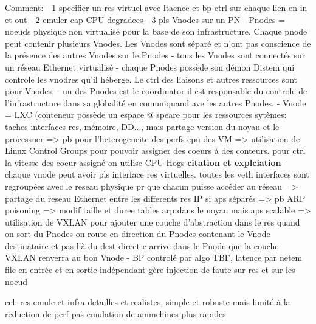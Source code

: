 Comment:
- 1 specifier un res virtuel avec ltaence et bp ctrl sur chaque lien en in et out
- 2 emuler cap CPU degradees
- 3 pls Vnodes sur un PN
- Pnodes = noeuds physique non virtualisé pour la base de son infrastructure. Chaque pnode peut contenir plusieurs Vnodes. Les Vnodes sont séparé et n'ont pas conscience de la présence des autres Vnodes sur le Pnodes
- tous les Vnodes sont connectés sur un réseau Ethernet virtualisé
- chaque Pnodes possède son démon Distem qui controle les vnodres qu'il héberge. Le ctrl des liaisons et autres ressources sont pour Vnodes.
- un des Pnodes est le coordinator il est responsable du controle de l'infrastructure dans sa globalité en comuniquand ave les autres Pnodes.
- Vnode = LXC (conteneur possède un espace @ speare pour les ressources sytèmes: taches interfaces res, mémoire, DD..., mais partage version du noyau et le processuer => pb pour l'heterogeneite des perfs cpu des VM => utilisation de Linux Control Groups pour pouvoir assigner des coeurs à des conteurs. pour ctrl la vitesse des coeur assigné on utilise CPU-Hogs \textbf{citation et explciation}
- chaque vnode peut avoir pls interface res virtuelles. toutes les veth interfaces sont regroupées avec le reseau physique pr que chacun puisse accéder au réseau => partage du reseau Ethernet entre les differents res IP si aps séparés => pb ARP poisoning => modif taille et duree tables arp dans le noyau mais aps scalable => utilisation de VXLAN pour ajouter une couche d'abstraction dans le res quand on sort du Pnodes on route en direction du Pnodes contenant le Vnode destinataire et pas l'à du dest direct c arrive dans le Pnode que la couche VXLAN renverra au bon Vnode
- BP controlé par algo TBF, latence par netem file en entrée et en sortie indépendant
gère injection de faute sur res et sur les noeud

ccl:
res emule et infra detailles et realistes, simple et robuste mais limité à la reduction de perf pas emulation de ammchines plus rapides.



